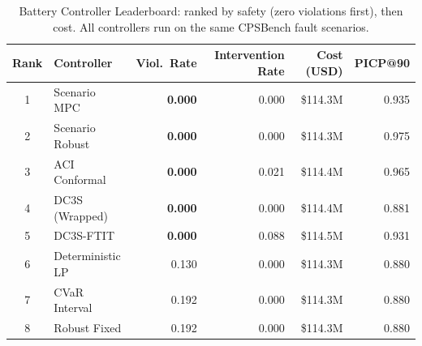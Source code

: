 \begin{table}[htbp]
\centering
\caption{Battery Controller Leaderboard: ranked by safety (zero violations first), then cost.  All controllers run on the same CPSBench fault scenarios.}
\label{tab:battery_leaderboard}
\begin{tabular}{clrrrr}
\toprule
Rank & Controller & Viol.\ Rate & Intervention Rate & Cost (USD) & PICP@90 \\
\midrule
1 & Scenario MPC & \textbf{0.000} & 0.000 & \$114.3M & 0.935 \\
2 & Scenario Robust & \textbf{0.000} & 0.000 & \$114.3M & 0.975 \\
3 & ACI Conformal & \textbf{0.000} & 0.021 & \$114.4M & 0.965 \\
4 & DC3S (Wrapped) & \textbf{0.000} & 0.000 & \$114.4M & 0.881 \\
5 & DC3S-FTIT & \textbf{0.000} & 0.088 & \$114.5M & 0.931 \\
6 & Deterministic LP & 0.130 & 0.000 & \$114.3M & 0.880 \\
7 & CVaR Interval & 0.192 & 0.000 & \$114.3M & 0.880 \\
8 & Robust Fixed & 0.192 & 0.000 & \$114.3M & 0.880 \\
\bottomrule
\end{tabular}
\end{table}